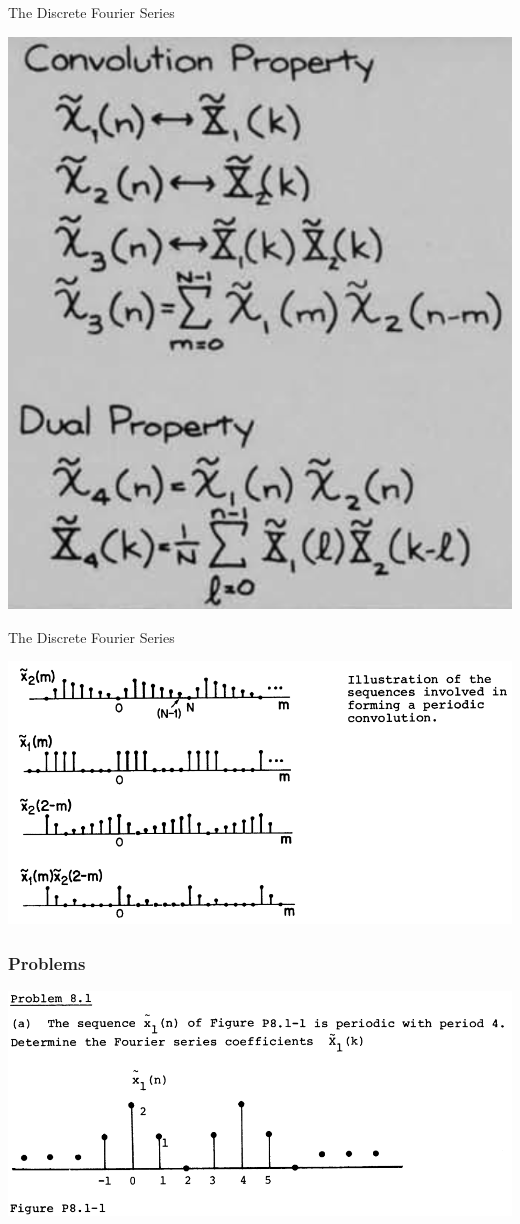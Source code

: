 \documentclass[pdflatex,compress,mathserif]{beamer}
\begin{document}
\begin{frame}{The Discrete Fourier Series}
	\begin{center}
		\includegraphics[width=0.5\linewidth]{img/img03}
	\end{center}
\end{frame}

\begin{frame}{The Discrete Fourier Series}
	\begin{center}
		\includegraphics[width=\linewidth]{img/img04}
	\end{center}
\end{frame}

\begin{frame}
	\frametitle{Problems}
	\begin{center}
		\includegraphics[width=\linewidth]{img/img05}
	\end{center}
\end{frame}
\end{document}
